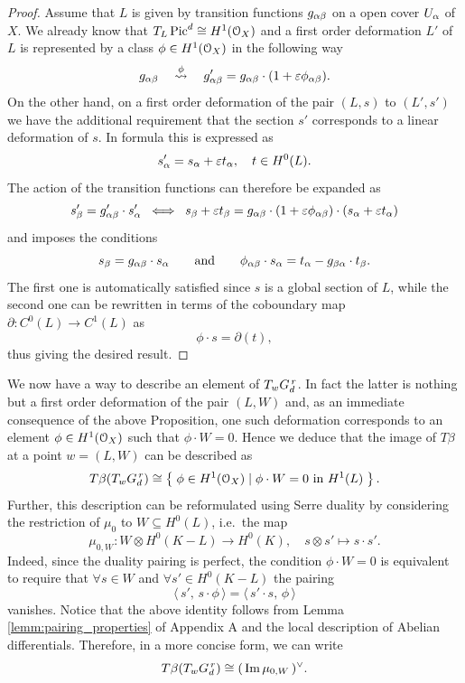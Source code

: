 	\begin{proof}
		Assume that $L$ is given by transition functions $g_{\alpha\beta}$ on a open cover $U_\alpha$ of $X$. We already know that $T_L \operatorname{Pic}^d \cong H^1(\mathcal{O}_X)$ and a first order deformation $L'$ of $L$ is represented by a class $\phi \in H^1(\mathcal{O}_X)$ in the following way
		$$ g_{\alpha\beta} \quad\overset{\phi}\leadsto\quad g'_{\alpha\beta} = g_{\alpha\beta} \cdot (1+ \varepsilon \phi_{\alpha\beta}). $$  
		On the other hand, on a first order deformation of the pair $(L,s)$ to $(L',s')$ we have the additional requirement that the section $s'$ corresponds to a linear deformation of $s$. In formula this is expressed as
		$$ s'_\alpha = s_\alpha + \varepsilon t_\alpha, \quad t \in H^0(L). $$
		The action of the transition functions can therefore be expanded as
		$$ s'_\beta = g'_{\alpha\beta} \cdot s'_\alpha \;\iff\; s_\beta + \varepsilon t_\beta = g_{\alpha\beta} \cdot (1 + \varepsilon \phi_{\alpha\beta})\cdot(s_\alpha + \varepsilon t_\alpha)$$
		and imposes the conditions
		$$ s_\beta = g_{\alpha\beta} \cdot s_\alpha \qquad \text{and} \qquad \phi_{\alpha\beta} \cdot s_\alpha = t_\alpha - g_{\beta\alpha}\cdot t_\beta. $$
		The first one is automatically satisfied since $s$ is a global section of $L$, while the second one can be rewritten in terms of the coboundary map $\partial : C^0(L) \to C^1(L)$ as
		$$ \phi \cdot s = \partial (t), $$
		thus giving the desired result.
	\end{proof}
	We now have a way to describe an element of $T_wG_d^{\,r}$. In fact the latter is nothing but a first order deformation of the pair $(L,W)$ and, as an immediate consequence of the above Proposition, one such deformation corresponds to an element $\phi\in H^1(\mathcal{O}_X)$ such that $\phi\cdot W = 0$. Hence we deduce that the image of $T\beta$ at a point $w=(L,W)$ can be described as
	\begin{equation*}
		T\beta(T_w G_d^{\,r}) \cong \left\{\;  \phi \in H^1(\mathcal{O}_X) \mid \phi\cdot W = 0 \text{ in } H^1(L)  \; \right\}.
	\end{equation*}
	Further, this description can be reformulated using Serre duality by considering the restriction of $\mu_0$ to $W\subseteq H^0(L)$, i.e.\ the map
	$$ \mu_{0,W} : W\otimes H^0(K-L) \to H^0(K), \quad s\otimes s' \mapsto s\cdot s'. $$
	Indeed, since the duality pairing is perfect, the condition $\phi\cdot W = 0$ is equivalent to require that $\forall s\in W$ and $\forall s'\in H^0(K-L)$ the pairing
	$$ \langle\, s',\, s\cdot \phi \, \rangle = \langle \,s'\cdot s,\, \phi \,\rangle $$
	vanishes. Notice that the above identity follows from Lemma \ref{lemm:pairing_properties} of Appendix A and the local description of Abelian differentials. Therefore, in a more concise form, we can write 
	\begin{equation}\label{eq:im_beta_*}
		T\beta(T_w G_d^{\,r})\cong(\,\operatorname{Im} \mu_{0,W}\,)^{\vee}.
	\end{equation}

